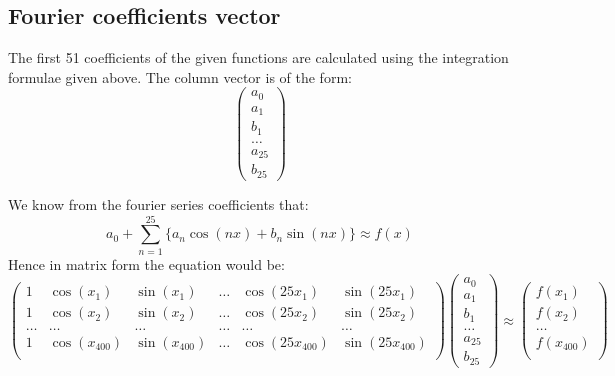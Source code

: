 \documentclass[12pt, a4paper]{article}
\begin{document}
\subsection{Fourier coefficients vector}
The first 51 coefficients of the given functions are calculated using the integration formulae given above. The column vector is of the form:
    \begin{equation*}\label{eq3}
        \begin{pmatrix}
            a_{0}\\
            a_{1}\\
            b_{1}\\
            \ldots \\
            a_{25}\\
            b_{25}
        \end{pmatrix}
    \end{equation*}

We know from the fourier series coefficients that:
\begin{equation*}
    a_{0}+\sum\limits_{n=1}^{25}  \{a_{n}\cos (nx)+b_{n}\sin (nx)\} \approx f(x)
\end{equation*}
Hence in matrix form the equation would be:
\begin{equation*}
    \begin{pmatrix}
        1 & \cos(x_{1}) & \sin(x_{1}) & \ldots & \cos(25x_{1}) & \sin(25x_{1}) \\
        1 & \cos(x_{2}) & \sin(x_{2}) & \ldots & \cos(25x_{2}) & \sin(25x_{2}) \\
        \ldots & \ldots & \ldots & \ldots & \ldots & \ldots \\
        1 & \cos(x_{400}) & \sin(x_{400}) & \ldots & \cos(25x_{400}) & \sin(25x_{400}) \\
    \end{pmatrix}
    \begin{pmatrix}
        a_{0} \\
        a_{1} \\
        b_{1} \\
        \ldots \\
        a_{25} \\
        b_{25}
    \end{pmatrix}
    \approx
    \begin{pmatrix}
        f(x_{1}) \\
        f(x_{2}) \\
        \ldots \\
        f(x_{400}) \\
    \end{pmatrix}
\end{equation*}
\end{document}
